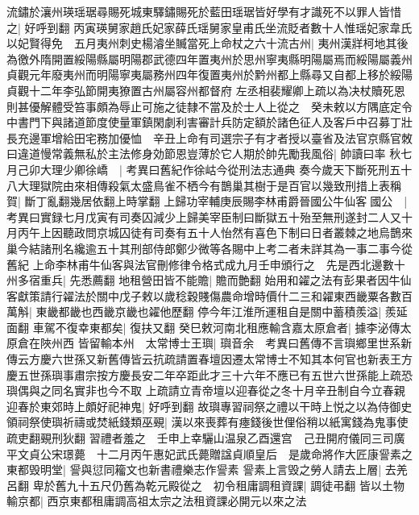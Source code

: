 流鏽於瀼州瑛瑶琚尋賜死城東驛鏽賜死於藍田瑶琚皆好學有才識死不以罪人皆惜之|{
	好呼到翻}
丙寅瑛舅家趙氏妃家薛氏瑶舅家皇甫氏坐流貶者數十人惟瑶妃家韋氏以妃賢得免　五月夷州刺史楊濬坐贓當死上命杖之六十流古州|{
	夷州漢牂柯地其後為徼外隋開置綏陽縣屬明陽郡武德四年置夷州於思州寧夷縣明陽屬焉而綏陽屬義州貞觀元年廢夷州而明陽寧夷屬務州四年復置夷州於黔州都上縣尋又自都上移於綏陽貞觀十二年李弘節開夷獠置古州屬容州都督府}
左丞相裴耀卿上疏以為决杖贖死恩則甚優解體受笞事頗為辱止可施之徒隸不當及於士人上從之　癸未敕以方隅底定令中書門下與諸道節度使量軍鎮閑劇利害審計兵防定額於諸色征人及客戶中召募丁壯長充邊軍增給田宅務加優恤　辛丑上命有司選宗子有才者授以臺省及法官京縣官敇曰違道慢常義無私於主法修身効節恩豈薄於它人期於帥先勵我風俗|{
	帥讀曰率}
秋七月己卯大理少卿徐嶠　|{
	考異曰舊紀作徐岵今從刑法志通典}
奏今歲天下斷死刑五十八大理獄院由來相傳殺氣太盛鳥雀不栖今有鵲巢其樹于是百官以幾致刑措上表稱賀|{
	斷丁亂翻幾居依翻上時掌翻}
上歸功宰輔庚辰賜李林甫爵晉國公牛仙客國公　|{
	考異曰實録七月戊寅有司奏囚減少上歸美宰臣制曰斷獄五十殆至無刑遂封二人又十月丙午上因聽政問京城囚徒有司奏有五十人怡然有喜色下制曰日者叢棘之地烏鵲來巢今結諸刑名纔逾五十其刑部侍郎鄭少微等各賜中上考二者未詳其為一事二事今從舊紀}
上命李林甫牛仙客與法官刪修律令格式成九月壬申頒行之　先是西北邊數十州多宿重兵|{
	先悉薦翻}
地租營田皆不能贍|{
	贍而艶翻}
始用和糴之法有彭果者因牛仙客獻策請行糴法於關中戊子敕以歲稔穀賤傷農命增時價什二三和糴東西畿粟各數百萬斛|{
	東畿都畿也西畿京畿也糴他歷翻}
停今年江淮所運租自是關中蓄積羨溢|{
	羨延面翻}
車駕不復幸東都矣|{
	復扶又翻}
癸巳敕河南北租應輸含嘉太原倉者|{
	據李泌傳太原倉在陜州西}
皆留輸本州　太常博士王璵|{
	璵音余　考異曰舊傳不言璵鄉里世系新傳云方慶六世孫又新舊傳皆云抗疏請置春壇因遷太常博士不知其本何官也新表王方慶五世孫璵事肅宗按方慶長安二年卒距此才三十六年不應已有五世六世孫能上疏恐璵偶與之同名實非也今不取}
上疏請立青帝壇以迎春從之冬十月辛丑制自今立春親迎春於東郊時上頗好祀神鬼|{
	好呼到翻}
故璵專習祠祭之禮以干時上悦之以為侍御史領祠祭使璵祈禱或焚紙錢類巫覡|{
	漢以來喪葬有瘞錢後世俚俗稍以紙寓錢為鬼事使疏吏翻覡刑狄翻}
習禮者羞之　壬申上幸驪山温泉乙酉還宫　己丑開府儀同三司廣平文貞公宋璟薨　十二月丙午惠妃武氏薨贈諡貞順皇后　是歲命將作大匠康諐素之東都毁明堂|{
	諐與愆同籕文也新書禮樂志作諐素}
諐素上言毁之勞人請去上層|{
	去羌呂翻}
卑於舊九十五尺仍舊為乾元殿從之　初令租庸調租資課|{
	調徒弔翻}
皆以土物輸京都|{
	西京東都租庸調高祖太宗之法租資課必開元以來之法}


